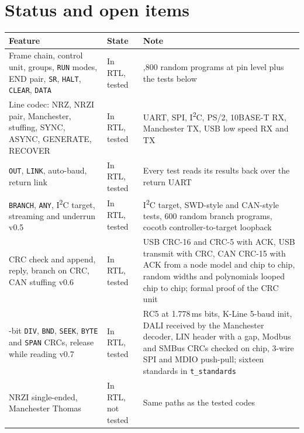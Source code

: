 \documentclass[11pt,a4paper]{article}
\newcommand{\vfive}{\textcolor{fivec}{\textsf{\small v0.5}}}
\newcommand{\vsix}{\textcolor{sixc}{\textsf{\small v0.6}}}
\newcommand{\vseven}{\textcolor{sevenc}{\textsf{\small v0.7}}}
\newcommand{\sig}[1]{\texttt{#1}}
\begin{document}
\section{Status and open items}

\begin{center}
\begin{tabularx}{\linewidth}{@{}>{\raggedright\arraybackslash}p{5.6cm} l >{\raggedright\arraybackslash}X@{}}
\toprule
Feature & State & Note \\
\midrule
Frame chain, control unit, groups, \sig{RUN} modes, END pair, \sig{SR}, \sig{HALT}, \sig{CLEAR}, \sig{DATA} & In RTL, tested & 1,800 random programs at pin level plus the tests below \\
Line codec: NRZ, NRZI pair, Manchester, stuffing, SYNC, ASYNC, GENERATE, RECOVER & In RTL, tested & UART, SPI, I\textsuperscript{2}C, PS/2, 10BASE-T RX, Manchester TX, USB low speed RX and TX \\
\sig{OUT}, \sig{LINK}, auto-baud, return link & In RTL, tested & Every test reads its results back over the return UART \\
\sig{BRANCH}, \sig{ANY}, I\textsuperscript{2}C target, streaming and underrun \vfive & In RTL, tested & I\textsuperscript{2}C target, SWD-style and CAN-style tests, 600 random branch programs, cocotb controller-to-target loopback \\
CRC check and append, reply, branch on CRC, CAN stuffing \vsix & In RTL, tested & USB CRC-16 and CRC-5 with ACK, USB transmit with CRC, CAN CRC-15 with ACK from a node model and chip to chip, random widths and polynomials looped chip to chip; formal proof of the CRC unit \\
22-bit \sig{DIV}, \sig{BND}, \sig{SEEK}, \sig{BYTE} and \sig{SPAN} CRCs, release while reading \vseven & In RTL, tested & RC5 at 1.778\,ms bits, K-Line 5-baud init, DALI received by the Manchester decoder, LIN header with a gap, Modbus and SMBus CRCs checked on chip, 3-wire SPI and MDIO push-pull; sixteen standards in \sig{t\_standards} \\
NRZI single-ended, Manchester Thomas & In RTL, not tested & Same paths as the tested codes \\
\bottomrule
\end{tabularx}
\end{center}
\end{document}
